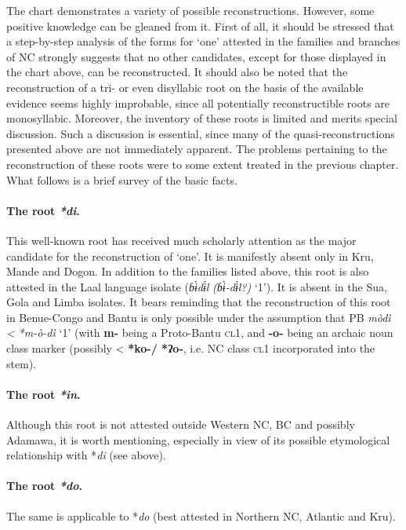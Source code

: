 The chart demonstrates a variety of possible reconstructions. However, some positive knowledge can be gleaned from it. First of all, it should be stressed that a step-by-step analysis of the forms for ‘one’ attested in the families and branches of NC strongly suggests that no other candidates, except for those displayed in the chart above, can be reconstructed. It should also be noted that the reconstruction of a tri- or even disyllabic root on the basis of the available evidence seems highly improbable, since all potentially reconstructible roots are monosyllabic. Moreover, the inventory of these roots is limited and merits special discussion. Such a discussion is essential, since many of the quasi-reconstructions presented above are not immediately apparent. The problems pertaining to the reconstruction of these roots were to some extent treated in the previous chapter. What follows is a brief survey of the basic facts.

\paragraph*{The root \textit{*di}.} This well-known root has received much scholarly attention as the major candidate for the reconstruction of ‘one’. It is manifestly absent only in Kru, Mande and Dogon. In addition to the families listed above, this root is also attested in the Laal language isolate (\textit{ɓ{\`{ɨ}}d{\'{ɨ}}l} \textit{(ɓ{\`{ɨ}}-d{\'{ɨ}}l?)} ‘1’). It is absent in the Sua, Gola and Limba isolates. It bears reminding that the reconstruction of this root in Benue-Congo and Bantu is only possible under the assumption that PB \textit{mòdì} \textit{<} \textit{*m-ò-dì} ‘1’ (with \textbf{m-} being a Proto-Bantu \textsc{cl}1, and \textbf{-}\textbf{o-} being an archaic noun class marker (possibly < \textbf{*ko}\textbf{-/ *ʔ}\textbf{o-}, i.e. NC class \textsc{cl}1 incorporated into the stem).

\paragraph*{The root \textit{*in}.} Although this root is not attested outside Western NC, BC and possibly Adamawa, it is worth mentioning, especially in view of its possible etymological relationship with *\textit{di} (see above).

\paragraph*{The root \textit{*do}.}The same is applicable to *\textit{do} (best attested in Northern NC, Atlantic and Kru).

